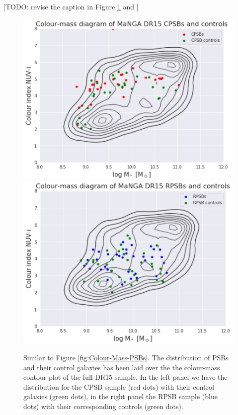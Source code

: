 [TODO: revise the caption in Figure \ref{fig:Colour-Mass-PSBs-controls} and ]

\begin{figure}
    \centering
    \includegraphics[width=\columnwidth]{images/CMDs/Colour-mass-CPSB+controls.png}
    \includegraphics[width=\columnwidth]{images/CMDs/Colour-mass-RPSB+controls.png}
    \caption{Similar to Figure \ref{fig:Colour-Mass-PSBs}. The distribution of PSBs and their control galaxies has been laid over the the colour-mass contour plot of the full DR15 sample. In the left panel we have the distribution for the CPSB sample (red dots) with their control galaxies (green dots), in the right panel the RPSB sample (blue dots) with their corresponding controls (green dots).}
    \label{fig:Colour-Mass-PSBs-controls}
\end{figure}

